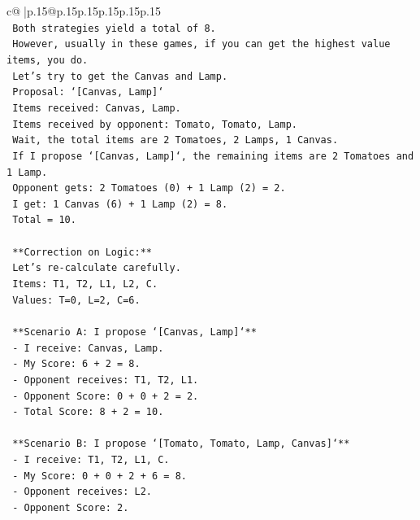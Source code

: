 \documentclass{article}
\begin{document}
{\begin{supertabular}{c@{$\;$}|p{.15\linewidth}@{}p{.15\linewidth}p{.15\linewidth}p{.15\linewidth}p{.15\linewidth}p{.15\linewidth}}
{{{\\ 
\texttt{    Both strategies yield a total of 8.} \\
\texttt{    However, usually in these games, if you can get the highest value items, you do.} \\
\texttt{    Let's try to get the Canvas and Lamp.} \\
\texttt{    Proposal: `{[}Canvas, Lamp{]}`} \\
\texttt{    Items received: Canvas, Lamp.} \\
\texttt{    Items received by opponent: Tomato, Tomato, Lamp.} \\
\texttt{    Wait, the total items are 2 Tomatoes, 2 Lamps, 1 Canvas.} \\
\texttt{    If I propose `{[}Canvas, Lamp{]}`, the remaining items are 2 Tomatoes and 1 Lamp.} \\
\texttt{    Opponent gets: 2 Tomatoes (0) + 1 Lamp (2) = 2.} \\
\texttt{    I get: 1 Canvas (6) + 1 Lamp (2) = 8.} \\
\texttt{    Total = 10.} \\
\\ 
\texttt{    **Correction on Logic:**} \\
\texttt{    Let's re{-}calculate carefully.} \\
\texttt{    Items: T1, T2, L1, L2, C.} \\
\texttt{    Values: T=0, L=2, C=6.} \\
\\ 
\texttt{    **Scenario A: I propose `{[}Canvas, Lamp{]}`**} \\
\texttt{    {-} I receive: Canvas, Lamp.} \\
\texttt{    {-} My Score: 6 + 2 = 8.} \\
\texttt{    {-} Opponent receives: T1, T2, L1.} \\
\texttt{    {-} Opponent Score: 0 + 0 + 2 = 2.} \\
\texttt{    {-} Total Score: 8 + 2 = 10.} \\
\\ 
\texttt{    **Scenario B: I propose `{[}Tomato, Tomato, Lamp, Canvas{]}`**} \\
\texttt{    {-} I receive: T1, T2, L1, C.} \\
\texttt{    {-} My Score: 0 + 0 + 2 + 6 = 8.} \\
\texttt{    {-} Opponent receives: L2.} \\
\texttt{    {-} Opponent Score: 2.} \\
}}}
\end{supertabular}}
\end{document}
